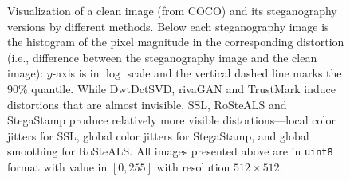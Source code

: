 \begin{figure}[!tb]
\centering
{}
\vspace{-1em}
\caption{Visualization of a clean image (from COCO) and its steganography versions by different methods. Below each steganography image is the histogram of the pixel magnitude in the corresponding distortion (i.e., difference between the steganography image and the clean image): $y$-axis is in $\log$ scale and the vertical dashed line marks the $90\%$ quantile. While DwtDctSVD, rivaGAN and TrustMark induce distortions that are almost invisible, SSL, RoSteALS and StegaStamp produce relatively more visible distortions---local color jitters for SSL, global color jitters for StegaStamp, and global smoothing for RoSteALS. All images presented above are in \texttt{uint8} format with value in $[0, 255]$ with resolution $512 \times 512$.}%
\vspace{-0.5em}
\label{Fig: watermark vis}
\end{figure}


